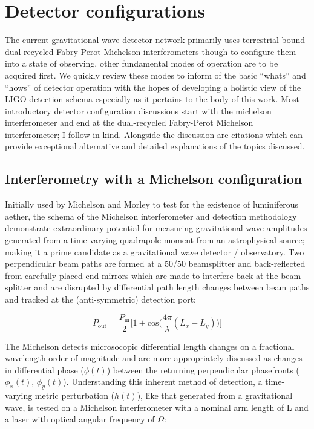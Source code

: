 \newpage

\section{Detector configurations}
The current gravitational wave detector network primarily uses terrestrial bound dual-recycled Fabry-Perot Michelson interferometers though to configure them into a state of observing, other fundamental modes of operation are to be acquired first. We quickly review these modes to inform of the basic ``whats'' and ``hows'' of detector operation with the hopes of developing a holistic view of the LIGO detection schema especially as it pertains to the body of this work. Most introductory detector configuration discussions start with the michelson interferometer and end at the dual-recycled Fabry-Perot Michelson interferometer; I follow in kind. Alongside the discussion are citations which can provide exceptional alternative and detailed explanations of the topics discussed.


\subsection{Interferometry with a Michelson configuration}
Initially used by Michelson and Morley to test for the existence of luminiferous aether, the schema of the Michelson interferometer and detection methodology demonstrate extraordinary potential for measuring gravitational wave amplitudes generated from a time varying quadrapole moment from an astrophysical source; making it a prime candidate as a gravitational wave detector / observatory. Two perpendicular beam paths are formed at a 50/50 beamsplitter and back-reflected from carefully placed end mirrors which are made to interfere back at the beam splitter and are disrupted by differential path length changes between beam paths and tracked at the (anti-symmetric) detection port:

\begin{equation}\label{P_MICH_AS}
	P_\mathrm{out} = \frac{P_\mathrm{in}}{2} \bigg[1+\mathrm{cos}\Big(\frac{4\pi}{\lambda} (L_x - L_y)\Big) \bigg]
\end{equation}

The Michelson detects microsocopic differential length changes on a fractional wavelength order of magnitude and are more appropriately discussed as changes in differential phase ($\phi(t)$) between the returning perpendicular phasefronts ($\phi_x(t)$, $\phi_y(t)$). Understanding this inherent method of detection, a time-varying metric perturbation ($h(t)$), like that generated from a gravitational wave, is tested on a Michelson interferometer with a nominal arm length of L and a laser with optical angular frequency of $\Omega$:


